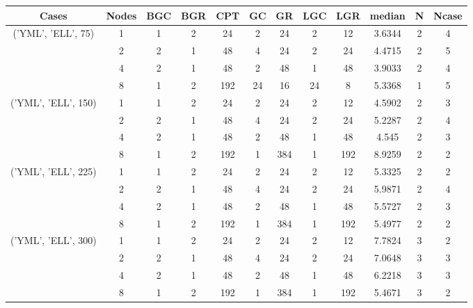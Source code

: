 \begin{tabular}{cccccccccccc}
\hline
Cases & Nodes& BGC& BGR& CPT& GC& GR& LGC& LGR& median & N & Ncase \\
\hline
\multirow{4}{*}{('YML', 'ELL', 75)}& 1& 1& 2& 24& 2& 24& 2& 12& 3.6344& 2& 4\\
& 2& 2& 1& 48& 4& 24& 2& 24& 4.4715& 2& 5\\
& 4& 2& 1& 48& 2& 48& 1& 48& 3.9033& 2& 4\\
& 8& 1& 2& 192& 24& 16& 24& 8& 5.3368& 1& 5\\
\hline
\multirow{4}{*}{('YML', 'ELL', 150)}& 1& 1& 2& 24& 2& 24& 2& 12& 4.5902& 2& 3\\
& 2& 2& 1& 48& 4& 24& 2& 24& 5.2287& 2& 4\\
& 4& 2& 1& 48& 2& 48& 1& 48& 4.545& 2& 3\\
& 8& 1& 2& 192& 1& 384& 1& 192& 8.9259& 2& 2\\
\hline
\multirow{4}{*}{('YML', 'ELL', 225)}& 1& 1& 2& 24& 2& 24& 2& 12& 5.3325& 2& 2\\
& 2& 2& 1& 48& 4& 24& 2& 24& 5.9871& 2& 4\\
& 4& 2& 1& 48& 2& 48& 1& 48& 5.5727& 2& 3\\
& 8& 1& 2& 192& 1& 384& 1& 192& 5.4977& 2& 2\\
\hline
\multirow{4}{*}{('YML', 'ELL', 300)}& 1& 1& 2& 24& 2& 24& 2& 12& 7.7824& 3& 2\\
& 2& 2& 1& 48& 4& 24& 2& 24& 7.0648& 3& 3\\
& 4& 2& 1& 48& 2& 48& 1& 48& 6.2218& 3& 3\\
& 8& 1& 2& 192& 1& 384& 1& 192& 5.4671& 3& 2\\
\hline
\end{tabular}
